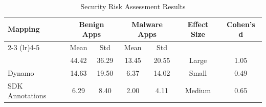 
\begin{table}[htbp]
\centering
\caption{Security Risk Assessment Results}
\label{tab:security_risk_assessment}
\begin{tabular}{lcccccc}
\toprule
Mapping & \multicolumn{2}{c}{Benign Apps} & \multicolumn{2}{c}{Malware Apps} & Effect Size & Cohen's d \\
\cmidrule(lr){2-3} \cmidrule(lr){4-5}
 & Mean & Std & Mean & Std & & \\
\midrule
\tool{} & 44.42 & 36.29 & 13.45 & 20.55 & Large & 1.05 \\
Dynamo & 14.63 & 19.50 & 6.37 & 14.02 & Small & 0.49 \\
SDK Annotations & 6.29 & 8.40 & 2.00 & 4.11 & Medium & 0.65 \\
\bottomrule
\end{tabular}
\end{table}